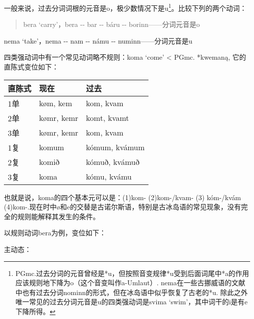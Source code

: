 一般来说，过去分词词根的元音是o，极少数情况下是u\footnote{PGmc.过去分词的元音曾经是*u，但按照音变规律*u受到后面词尾中*a的作用应该规则地下降为o（这个音变叫作a-Umlaut）.
  nema在一些古挪威语的文献中也有过去分词nominn的形式，但在冰岛语中似乎恢复了古老的*u.
  除此之外唯一常见的过去分词元音是u的四类强动词是svima
  `swim'，其中词干的i是有e下降所得。}。比较下列的两个动词：

\begin{quote}
  bera `carry‌'，bera -\/- bar -\/- báru -\/- borinn------分词元音是o
\end{quote}

nema `take‌'，nema -\/- nam -\/- námu -\/- numinn------分词元音是u

四类强动词中有一个常见动词略不规则：koma `come' \textless{} PGmc.
*kwemaną, 它的直陈式变位如下：

\begin{longtable}{lll}
  \toprule
  直陈式 & 现在       & 过去          \\
  \midrule
  \endhead
  \bottomrule
  \endfoot
  1单    & køm, kem   & kom, kvam     \\
  2单    & kømr, kemr & komt, kvamt   \\
  3单    & kømr, kemr & kom, kvam     \\
  1复    & komum      & kómum, kvámum \\
  2复    & komið      & kómuð, kvámuð \\
  3复    & koma       & kómu, kvámu   \\
\end{longtable}

也就是说，koma的四个基本元可以是：(1)kom- (2)kom-/kvam- (3) kóm-/kvám
(4)kom-.现在时中ø和e的交替是古诺尔斯语，特别是古冰岛语的常见现象，没有完全的规则能解释其发生的条件。

以规则动词bera为例，变位如下：

主动态：

